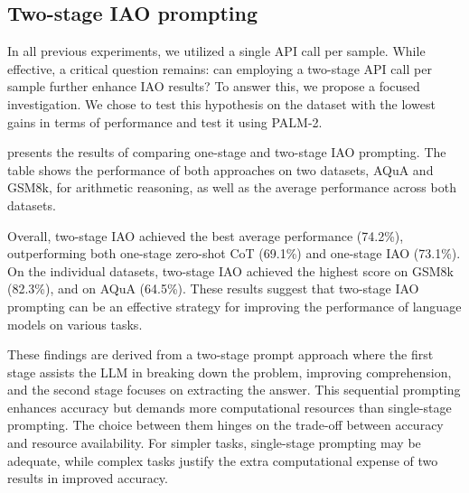 \subsection{Two-stage IAO prompting}
In all previous experiments, we utilized a single API call per sample. While effective, a critical question remains: can employing a two-stage API call per sample further enhance IAO results? To answer this, we propose a focused investigation. We chose to test this hypothesis on the dataset with the lowest gains in terms of performance and test it using PALM-2.

 presents the results of comparing one-stage and two-stage IAO prompting. The table shows the performance of both approaches on two datasets, AQuA and GSM8k, for arithmetic reasoning, as well as the average performance across both datasets.

Overall, two-stage IAO achieved the best average performance (74.2\%), outperforming both one-stage zero-shot CoT (69.1\%) and one-stage IAO (73.1\%). On the individual datasets, two-stage IAO achieved the highest score on GSM8k (82.3\%), and on AQuA (64.5\%).
These results suggest that two-stage IAO prompting can be an effective strategy for improving the performance of language models on various tasks. 

These findings are derived from a two-stage prompt approach where the first stage assists the LLM in breaking down the problem, improving comprehension, and the second stage focuses on extracting the answer. This sequential prompting enhances accuracy but demands more computational resources than single-stage prompting. The choice between them hinges on the trade-off between accuracy and resource availability. For simpler tasks, single-stage prompting may be adequate, while complex tasks justify the extra computational expense of two results in improved accuracy.

\begin{table}[th]
\centering
{}
\caption{One stage vs two stage prompting comparison.}
\label{tab:2stage}
\vspace{-.08cm}
\end{table}


